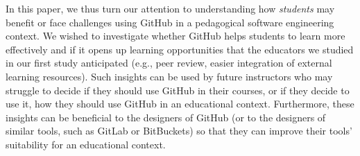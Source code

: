In this paper, we thus turn our attention to understanding how \emph{students} may benefit or face challenges using GitHub in a pedagogical software engineering context.  We wished to investigate whether GitHub helps students to learn more effectively and if it opens up learning opportunities that the educators we studied in our first study anticipated (e.g., peer review, easier integration of external learning resources). Such insights can be used by future instructors who may struggle to decide if they should use GitHub in their courses, or if they decide to use it, how they should use GitHub in an educational context.   Furthermore, these insights can be beneficial to the designers of GitHub (or to the designers of similar tools, such as GitLab or BitBuckets) so that they can improve their tools' suitability for an educational context. 







